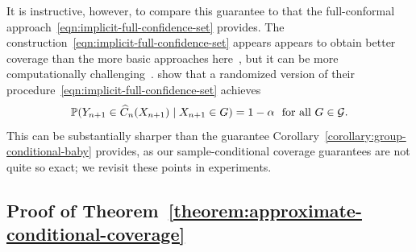 \documentclass{article}
\newcommand{\scorefunc}{s}
\newcommand{\scoreval}{\scorefunc}
\begin{document}
It is instructive, however, to compare this guarantee to that the
full-conformal approach~\eqref{eqn:implicit-full-confidence-set}
provides.
%
The construction~\eqref{eqn:implicit-full-confidence-set} appears
appears to obtain better coverage than the more basic approaches
here~\cite[Fig.~3]{GibbsChCa23}, but it can be more
computationally challenging~\cite[Fig.~6]{GibbsChCa23}.
%
\citet{GibbsChCa23} show that a randomized version of their
procedure~\eqref{eqn:implicit-full-confidence-set} achieves
\begin{equation*}
  \mathbb{P}(Y_{n + 1} \in \widehat{C}_n(X_{n+1}) \mid X_{n + 1} \in G)
  = 1 - \alpha ~~ \mbox{for~all~} G \in \mathcal{G}.
\end{equation*}
%
This can be substantially sharper than the guarantee
Corollary~\ref{corollary:group-conditional-baby} provides, as our
sample-conditional coverage guarantees are not quite so exact; we revisit
these points in experiments.

\subsection{Proof of Theorem~\ref{theorem:approximate-conditional-coverage}}
\label{sec:proof-approximate-conditional-coverage}
\end{document}

